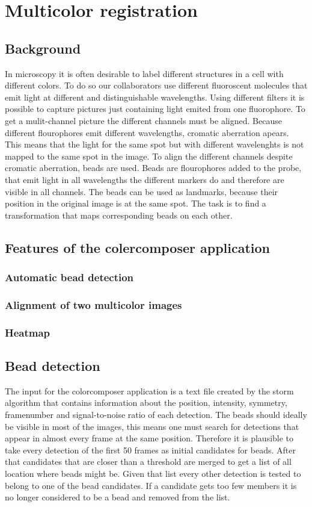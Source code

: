 \chapter{Multicolor registration}
\section{Background}
In microscopy it is often desirable to label different structures in a cell with
different colors. To do so our collaborators use different fluoroscent molecules
that emit light at different and distinguishable wavelengths. Using different
filters it is possible to capture pictures just containing light emited from one
fluorophore. To get a mulit-channel picture the different channels must be
aligned. Because different flourophores emit different wavelengths, cromatic
aberration apears. This means that the light for the same spot but with
different wavelenghts is not mapped to the same spot in the image. To align the
different channels despite cromatic aberration, beads are used. Beads are
flourophores added to the probe, that emit light in all wavelengths the
different markers do and therefore are visible in all channels. The beads can be
used as landmarks, because their position in the original image is at the same
spot. The task is to find a transformation that maps corresponding beads on each
other.
\section{Features of the colercomposer application}
\subsection{Automatic bead detection}
\subsection{Alignment of two multicolor images}
\subsection{Heatmap}

\section{Bead detection}
The input for the colorcomposer application is a text file created by the storm
algorithm that contains information about the position, intensity, symmetry,
framenumber and signal-to-noise ratio of each detection. The beads should
ideally be visible in most of the images, this means one must search for
detections that appear in almost every frame at the same position. Therefore it
is plausible to take every detection of the first 50 frames as initial
candidates for beads. After that candidates that are closer than a threshold are
merged to get a list of all location where beads might be. Given that list every
other detection is tested to belong to one of the bead candidates. If a
candidate gets too few members it is no longer considered to be a bead and
removed from the list.
